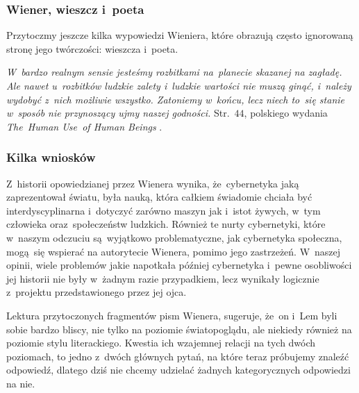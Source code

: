 \documentclass[10pt,t]{beamer}
\begin{document}
\begin{frame}
  \frametitle{Wiener, wieszcz i~poeta}


  Przytoczmy jeszcze kilka wypowiedzi Wieniera, które obrazują często
  ignorowaną stronę jego twórczości: wieszcza i~poeta.

  \textit{W~bardzo realnym sensie jesteśmy rozbitkami na~planecie skazanej
    na zagładę. Ale nawet u~rozbitków ludzkie zalety i~ludzkie wartości
    nie muszą ginąć, i~należy wydobyć z~nich możliwie wszystko. Zatoniemy
    w~końcu, lecz niech to~się stanie w~sposób nie przynoszący ujmy naszej
    godności.} Str.~$44$, polskiego wydania \textit{The~Human Use~of Human
    Beings} \parencite{Wiener-Cybernetyka-a-spoleczenstwo-Pub-2016}.

\end{frame}





\begin{frame}
  \frametitle{Kilka wniosków}


  Z~historii opowiedzianej przez Wienera wynika, że~cybernetyka jaką
  zaprezentował światu, była nauką, która całkiem świadomie chciała
  być interdyscyplinarna i~dotyczyć zarówno maszyn jak i~istot żywych,
  w~tym człowieka oraz~społeczeństw ludzkich. Również te nurty cybernetyki,
  które w~naszym odczuciu są~wyjątkowo problematyczne, jak cybernetyka
  społeczna, mogą~się wspierać na autorytecie Wienera, pomimo jego
  zastrzeżeń. W~naszej opinii, wiele problemów jakie napotkała później
  cybernetyka i~pewne osobliwości jej historii nie były w~żadnym razie
  przypadkiem, lecz wynikały logicznie z~projektu przedstawionego przez
  jej ojca.

  Lektura przytoczonych fragmentów pism Wienera, sugeruje, że~on i~Lem byli
  sobie bardzo bliscy, nie tylko na poziomie światopoglądu, ale niekiedy
  również na poziomie stylu literackiego. Kwestia ich wzajemnej relacji na
  tych dwóch poziomach, to jedno z~dwóch głównych pytań, na które teraz
  próbujemy znaleźć odpowiedź, dlatego dziś nie chcemy udzielać żadnych
  kategorycznych odpowiedzi na nie.

\end{frame}










\end{document}
